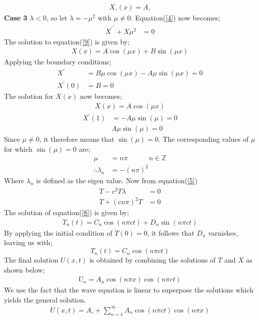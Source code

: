 \documentclass[12pt,a4paper]{article}
\newcommand{\Z}{\mathbb{Z}}
\begin{document}
\begin{itemize}
\begin{align*}
X_{\circ}(x)=A_{\circ}
\end{align*}
\textbf{Case 3} $\lambda <0$, so let $\lambda=-\mu^{2}$ with $\mu \neq 0$. Equation(\ref{4}) now becomes;
\begin{align}
{X^{\prime}}^{\prime}+X\mu^{2}&=0 \label{9}
\end{align}
The solution to equation(\ref{9}) is given by;
\begin{align*}
X(x)=A\cos(\mu x)+B\sin(\mu x)
\end{align*}
Applying the boundary conditions;
\begin{align*}
X^{\prime}&=B\mu \cos(\mu x)-A\mu \sin(\mu x)=0\\
X^{\prime}(0)&=B=0
\end{align*}
The solution for $X(x)$ now becomes;
\begin{align*}
X(x)=A \cos(\mu x)
\end{align*}
\begin{align*}
X^{\prime}(1)&=-A\mu \sin(\mu )=0\\ 
&A\mu \sin(\mu )=0
\end{align*}
Since $\mu \neq 0$, it therefore means that $\sin(\mu)=0$. The corresponding values of $\mu$ for which $\sin(\mu)=0$ are;
\begin{align*}
\mu&=n\pi 			\quad \quad \quad n\in \Z\\ 		
\therefore \lambda_{n}&=-(n\pi)^{2}
\end{align*}
Where $\lambda_{n} $ is defined as the eigen value. Now from equation(\ref{5})
\begin{align}
\ddot{T}-c^{2}T\lambda&=0\\
\ddot{T}+(cn\pi)^{2}T&=0\label{8}
\end{align}
The solution of equation(\ref{8}) is given by;
\begin{align}
T_{n}(t)=C_{n}\cos(n\pi ct)+D_{n}\sin (n\pi ct) \label{10}
\end{align}
By applying the initial condition of $\dot{T}(0)=0$, it follows that $D_{n}$ varnishes, leaving us with;
$$T_{n}(t)=C_{n}\cos(n\pi ct)$$
The final solution $U(x,t)$ is obtained by combining the solutions of $T$ and $X$ as shown below;
\begin{align*}
U_{n}=A_{n}\cos(n\pi x)\cos(n\pi ct)
\end{align*}
We use the fact that the wave equation is linear to superpose the solutions which yields the general solution.
\begin{align}
U(x,t)=A_{\circ}+\sum_{n=1}^{\infty}A_{n}\cos(n\pi ct)\cos(n\pi x) \label{11}

\end{align}
\end{itemize}
\end{document}
